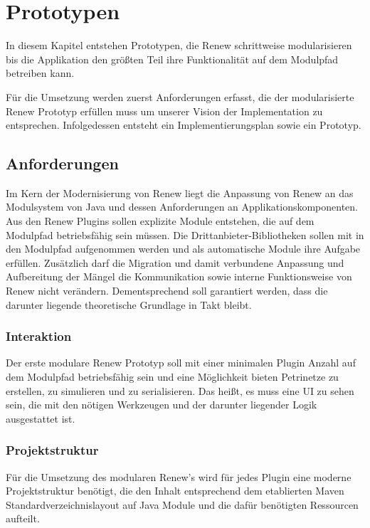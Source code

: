 \chapter{Prototypen} 
	In diesem Kapitel entstehen Prototypen, die Renew schrittweise modularisieren bis die Applikation den größten Teil ihre Funktionalität auf dem Modulpfad betreiben kann. \newline

	Für die Umsetzung werden zuerst Anforderungen erfasst, die der modularisierte Renew Prototyp erfüllen muss um unserer Vision der Implementation zu entsprechen. Infolgedessen entsteht ein Implementierungsplan sowie ein Prototyp. 

\section{Anforderungen} \label{sec:anforderungen}
	Im Kern der Modernisierung von Renew liegt die Anpassung von Renew an das Modulsystem von Java und dessen Anforderungen an Applikationskomponenten. Aus den Renew Plugins sollen explizite Module entstehen, die auf dem Modulpfad betriebsfähig sein müssen. Die Drittanbieter-Bibliotheken sollen mit in den Modulpfad aufgenommen werden und als automatische Module ihre Aufgabe erfüllen. Zusätzlich darf die Migration und damit verbundene Anpassung und Aufbereitung der Mängel die Kommunikation sowie interne Funktionsweise von Renew nicht verändern. Dementsprechend soll garantiert werden, dass die darunter liegende theoretische Grundlage in Takt bleibt. 

\subsection{Interaktion}
	Der erste modulare Renew Prototyp soll mit einer minimalen Plugin Anzahl auf dem Modulpfad betriebsfähig sein und eine Möglichkeit bieten Petrinetze zu erstellen, zu simulieren und zu serialisieren. Das heißt, es muss eine UI zu sehen sein, die mit den nötigen Werkzeugen und der darunter liegender Logik ausgestattet ist. 

\subsection{Projektstruktur}
	Für die Umsetzung des modularen Renew's wird für jedes Plugin eine moderne Projektstruktur benötigt, die den Inhalt entsprechend dem etablierten Maven Standardverzeichnislayout auf Java Module und die dafür benötigten Ressourcen aufteilt. 


